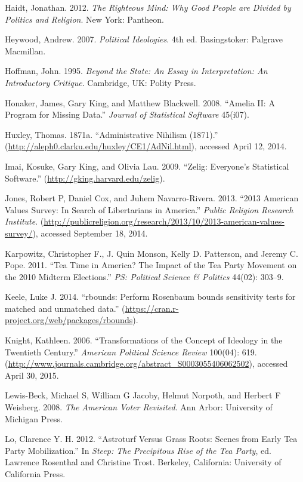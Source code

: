 \documentclass[12pt,]{article}
\begin{document}
Haidt, Jonathan. 2012. \emph{The Righteous Mind: Why Good People are
Divided by Politics and Religion}. New York: Pantheon.

Heywood, Andrew. 2007. \emph{Political Ideologies}. 4th ed.
Basingstoker: Palgrave Macmillan.

Hoffman, John. 1995. \emph{Beyond the State: An Essay in Interpretation:
An Introductory Critique}. Cambridge, UK: Polity Press.

Honaker, James, Gary King, and Matthew Blackwell. 2008. ``Amelia II: A
Program for Missing Data.'' \emph{Journal of Statistical Software}
45(i07).

Huxley, Thomas. 1871a. ``Administrative Nihilism (1871).''
(\url{http://aleph0.clarku.edu/huxley/CE1/AdNil.html}), accessed April
12, 2014.

Imai, Kosuke, Gary King, and Olivia Lau. 2009. ``Zelig: Everyone's
Statistical Software.'' (\url{http://gking.harvard.edu/zelig}).

Jones, Robert P, Daniel Cox, and Juhem Navarro-Rivera. 2013. ``2013
American Values Survey: In Search of Libertarians in America.''
\emph{Public Religion Research Institute}.
(\url{http://publicreligion.org/research/2013/10/2013-american-values-survey/}),
accessed September 18, 2014.

Karpowitz, Christopher F., J. Quin Monson, Kelly D. Patterson, and
Jeremy C. Pope. 2011. ``Tea Time in America? The Impact of the Tea Party
Movement on the 2010 Midterm Elections.'' \emph{PS: Political Science \&
Politics} 44(02): 303--9.

Keele, Luke J. 2014. ``rbounds: Perform Rosenbaum bounds sensitivity
tests for matched and unmatched data.''
(\url{https://cran.r-project.org/web/packages/rbounds}).

Knight, Kathleen. 2006. ``Transformations of the Concept of Ideology in
the Twentieth Century.'' \emph{American Political Science Review}
100(04): 619.
(\url{http://www.journals.cambridge.org/abstract_S0003055406062502}),
accessed April 30, 2015.

Lewis-Beck, Michael S, William G Jacoby, Helmut Norpoth, and Herbert F
Weisberg. 2008. \emph{The American Voter Revisited}. Ann Arbor:
University of Michigan Press.

Lo, Clarence Y. H. 2012. ``Astroturf Versus Grass Roots: Scenes from
Early Tea Party Mobilization.'' In \emph{Steep: The Precipitous Rise of
the Tea Party}, ed. Lawrence Rosenthal and Christine Trost. Berkeley,
California: University of California Press.
\end{document}
